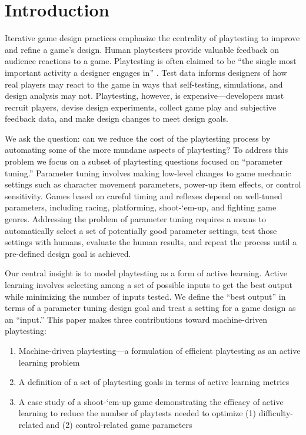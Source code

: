 \documentclass{sig-alternate}
\begin{document}

\section{Introduction}



Iterative game design practices emphasize the centrality of playtesting to improve and refine a game's design.
Human playtesters provide valuable feedback on audience reactions to a game.
Playtesting is often claimed to be ``the single most important activity a designer engages in'' \cite{fullerton2008:playcentric}.
Test data informs designers of how real players may react to the game in ways that self-testing, simulations, and design analysis may not.
Playtesting, however, is expensive---developers must recruit players, devise design experiments, collect game play and subjective feedback data, and make design changes to meet design goals.


We ask the question: can we reduce the cost of the playtesting process by automating some of the more mundane aspects of playtesting?
To address this problem we focus on a subset of playtesting questions focused on ``parameter tuning.''
Parameter tuning involves making low-level changes to game mechanic settings such as character movement parameters, power-up item effects, or control sensitivity.
Games based on careful timing and reflexes depend on well-tuned parameters, including racing, platforming, shoot-`em-up, and fighting game genres.
Addressing the problem of parameter tuning requires a means to automatically select a set of potentially good parameter settings, test those settings with humans, evaluate the human results, and repeat the process until a pre-defined design goal is achieved.


Our central insight is to model playtesting as a form of active learning.
Active learning \cite{settles2012:al-book} involves selecting among a set of possible inputs to get the best output while minimizing the number of inputs tested.
We define the ``best output'' in terms of a parameter tuning design goal and treat a setting for a game design as an ``input.''
This paper makes three contributions toward machine-driven playtesting:
\begin{enumerate}
\item Machine-driven playtesting---a formulation of efficient playtesting as an active learning problem %
\item A definition of a set of playtesting goals in terms of active learning metrics
\item A case study of a shoot-`em-up game demonstrating the efficacy of active learning to reduce the number of playtests needed to optimize (1) difficulty-related and (2) control-related game parameters
\end{enumerate}
\end{document}
